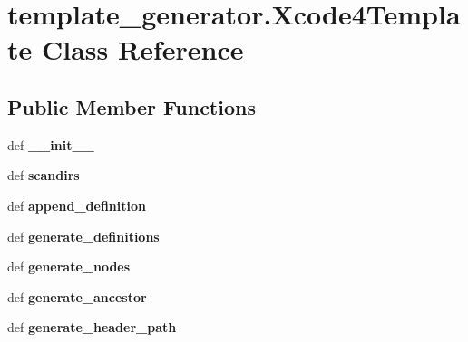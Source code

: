 \hypertarget{classtemplate__generator_1_1_xcode4_template}{\section{template\-\_\-generator.\-Xcode4\-Template Class Reference}
\label{classtemplate__generator_1_1_xcode4_template}
}
\subsection*{Public Member Functions}
\begin{DoxyCompactItemize}
\item 
\hypertarget{classtemplate__generator_1_1_xcode4_template_a4aea8cd77c07dffc707ac38503cb5694}{def {\bfseries \-\_\-\-\_\-init\-\_\-\-\_\-}}\label{classtemplate__generator_1_1_xcode4_template_a4aea8cd77c07dffc707ac38503cb5694}

\item 
\hypertarget{classtemplate__generator_1_1_xcode4_template_a07d679d7ba54fdc69cb3a3b10a5c5cd7}{def {\bfseries scandirs}}\label{classtemplate__generator_1_1_xcode4_template_a07d679d7ba54fdc69cb3a3b10a5c5cd7}

\item 
\hypertarget{classtemplate__generator_1_1_xcode4_template_aad2029a57491c6299f98709ca117e964}{def {\bfseries append\-\_\-definition}}\label{classtemplate__generator_1_1_xcode4_template_aad2029a57491c6299f98709ca117e964}

\item 
\hypertarget{classtemplate__generator_1_1_xcode4_template_a7328587dc6ea3ef501633eaaa5206cda}{def {\bfseries generate\-\_\-definitions}}\label{classtemplate__generator_1_1_xcode4_template_a7328587dc6ea3ef501633eaaa5206cda}

\item 
\hypertarget{classtemplate__generator_1_1_xcode4_template_afaae5946215480e060baefadf754b11f}{def {\bfseries generate\-\_\-nodes}}\label{classtemplate__generator_1_1_xcode4_template_afaae5946215480e060baefadf754b11f}

\item 
\hypertarget{classtemplate__generator_1_1_xcode4_template_a563d9e34294b89339766209cffe46e0d}{def {\bfseries generate\-\_\-ancestor}}\label{classtemplate__generator_1_1_xcode4_template_a563d9e34294b89339766209cffe46e0d}

\item 
\hypertarget{classtemplate__generator_1_1_xcode4_template_a58d2e5cdca06b98edd96eb7063ef9d4d}{def {\bfseries generate\-\_\-header\-\_\-path}}\label{classtemplate__generator_1_1_xcode4_template_a58d2e5cdca06b98edd96eb7063ef9d4d}


\end{DoxyCompactItemize}
